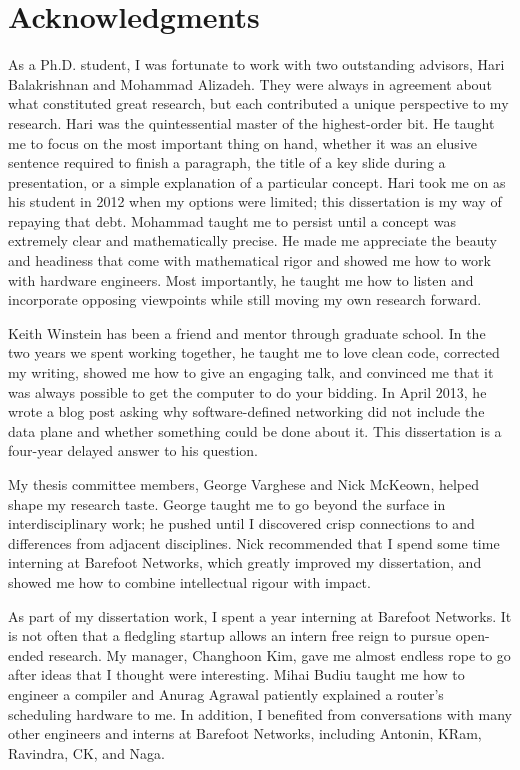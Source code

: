 \chapter*{Acknowledgments}
%

As a Ph.D. student, I was fortunate to work with two outstanding advisors, Hari
Balakrishnan and Mohammad Alizadeh. They were always in agreement about what
constituted great research, but each contributed a unique perspective to my
research.  Hari was the quintessential master of the highest-order bit. He
taught me to focus on the most important thing on hand, whether it was an
elusive sentence required to finish a paragraph, the title of a key slide
during a presentation, or a simple explanation of a particular concept. Hari
took me on as his student in 2012 when my options were limited; this
dissertation is my way of repaying that debt. Mohammad taught me to persist
until a concept was extremely clear and mathematically precise. He made me
appreciate the beauty and headiness that come with mathematical rigor and
showed me how to work with hardware engineers. Most importantly, he taught me
how to listen and incorporate opposing viewpoints while still moving my own
research forward.

Keith Winstein has been a friend and mentor through graduate school.  In the
two years we spent working together, he taught me to love clean code, corrected
my writing, showed me how to give an engaging talk, and convinced me that it
was always possible to get the computer to do your bidding. In April 2013, he
wrote a blog post asking why software-defined networking did not include the
data plane and whether something could be done about it. This dissertation is a
four-year delayed answer to his question.

My thesis committee members, George Varghese and Nick McKeown, helped shape my
research taste. George taught me to go beyond the surface in interdisciplinary
work; he pushed until I discovered crisp connections to and differences from
adjacent disciplines. Nick recommended that I spend some time interning at
Barefoot Networks, which greatly improved my dissertation, and showed me how to
combine intellectual rigour with impact.

As part of my dissertation work, I spent a year interning at Barefoot Networks.
It is not often that a fledgling startup allows an intern free reign to pursue
open-ended research. My manager, Changhoon Kim, gave me almost endless rope to
go after ideas that I thought were interesting. Mihai Budiu taught me how to
engineer a compiler and Anurag Agrawal patiently explained a router's
scheduling hardware to me. In addition, I benefited from conversations with
many other engineers and interns at Barefoot Networks, including Antonin, KRam,
Ravindra, CK, and Naga.

